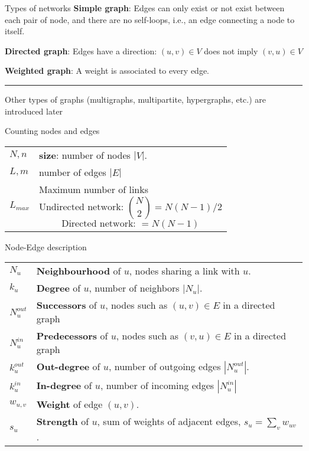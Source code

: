 \begin{textbox}{Types of networks}
    \textbf{Simple graph}: Edges can only exist or not exist between each pair of node, and there are no self-loops, i.e., an edge connecting a node to itself.

    \textbf{Directed graph}: Edges have a direction: $(u,v)\in V$ does not imply $(v,u)\in V$

    \textbf{Weighted graph}: A weight is associated to every edge.

    \noindent\rule{4cm}{0.1pt}

    \tiny{
        Other types of graphs (multigraphs, multipartite, hypergraphs, etc.) are introduced later}
\end{textbox}


\begin{textbox}{Counting nodes and edges}
    \begin{tabular}{p{}|p{}}\scriptsize
        $N,n$     & \textbf{size}: number of nodes $|V|$. \\

        $L,m$     & number of edges $|E|$                 \\
        $L_{max}$ & Maximum number of links
        \[  \text{Undirected network: } {N\choose 2 }=N(N-1)/2
        \]
        \[
            \text{Directed network: }=N(N-1)
        \]
    \end{tabular}
\end{textbox}


\begin{textbox}{Node-Edge description}
    \begin{tabular}{p{}|p{}}\scriptsize
        $N_u$       & \textbf{Neighbourhood} of $u$, nodes sharing a link with $u$.                      \\

        $k_u$       & \textbf{Degree} of $u$, number of neighbors $|N_u|$.                               \\
        \hline
        $N^{out}_u$ & \textbf{Successors} of $u$, nodes such as $(u,v)\in E$ in a directed graph         \\

        $N^{in}_u$  & \textbf{Predecessors} of $u$, nodes such as $(v,u)\in E$ in a directed graph       \\

        $k^{out}_u$ & \textbf{Out-degree} of $u$, number of outgoing edges  $|N^{out}_u|$.               \\

        $k^{in}_u$  & \textbf{In-degree} of $u$, number of incoming edges $|N^{in}_u|$                   \\
        \hline
        $w_{u,v}$   & \textbf{Weight} of edge $(u,v)$.                                                   \\

        $s_u$       & \textbf{Strength} of $u$, sum of weights of adjacent edges, $s_u = \sum_v w_{uv}$. \\
    \end{tabular}
\end{textbox}


